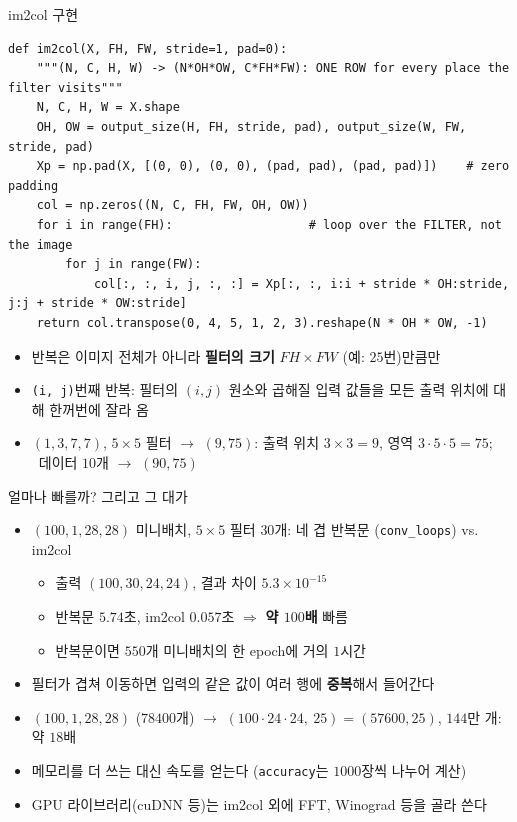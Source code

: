 \documentclass[aspectratio=169,11pt]{beamer}
\begin{document}
\begin{frame}[fragile]{im2col 구현}
\begin{lstlisting}
def im2col(X, FH, FW, stride=1, pad=0):
    """(N, C, H, W) -> (N*OH*OW, C*FH*FW): ONE ROW for every place the filter visits"""
    N, C, H, W = X.shape
    OH, OW = output_size(H, FH, stride, pad), output_size(W, FW, stride, pad)
    Xp = np.pad(X, [(0, 0), (0, 0), (pad, pad), (pad, pad)])    # zero padding
    col = np.zeros((N, C, FH, FW, OH, OW))
    for i in range(FH):                   # loop over the FILTER, not the image
        for j in range(FW):
            col[:, :, i, j, :, :] = Xp[:, :, i:i + stride * OH:stride, j:j + stride * OW:stride]
    return col.transpose(0, 4, 5, 1, 2, 3).reshape(N * OH * OW, -1)
\end{lstlisting}
\small
\begin{itemize}
\item 반복은 이미지 전체가 아니라 \textbf{필터의 크기} $FH\times FW$ (예: $25$번)만큼만
\item \texttt{(i, j)}번째 반복: 필터의 $(i,j)$ 원소와 곱해질 입력 값들을 모든 출력 위치에 대해 한꺼번에 잘라 옴
\item $(1,3,7,7)$, $5\times5$ 필터 $\to$ $(9,75)$: 출력 위치 $3\times3=9$, 영역 $3\cdot5\cdot5=75$; \ 데이터 $10$개 $\to$ $(90,75)$
\end{itemize}
\end{frame}

\begin{frame}{얼마나 빠를까? 그리고 그 대가}
\begin{itemize}
\item $(100,1,28,28)$ 미니배치, $5\times5$ 필터 $30$개: 네 겹 반복문 (\texttt{conv\_loops}) vs. im2col
  \begin{itemize}
  \item 출력 $(100,30,24,24)$, 결과 차이 $5.3\times10^{-15}$
  \item 반복문 $5.74$초, im2col $0.057$초 $\Rightarrow$ \textbf{약 $100$배} 빠름
  \item 반복문이면 $550$개 미니배치의 한 epoch에 거의 $1$시간
  \end{itemize}
\end{itemize}
\begin{remarkbox}
\small
\begin{itemize}
\item 필터가 겹쳐 이동하면 입력의 같은 값이 여러 행에 \textbf{중복}해서 들어간다
\item $(100,1,28,28)$ ($78400$개) $\to$ $(100\cdot24\cdot24,\ 25)=(57600,25)$, $144$만 개: 약 $18$배
\item 메모리를 더 쓰는 대신 속도를 얻는다 (\texttt{accuracy}는 $1000$장씩 나누어 계산)
\item GPU 라이브러리(cuDNN 등)는 im2col 외에 FFT, Winograd 등을 골라 쓴다
\end{itemize}
\end{remarkbox}
\end{frame}
\end{document}
